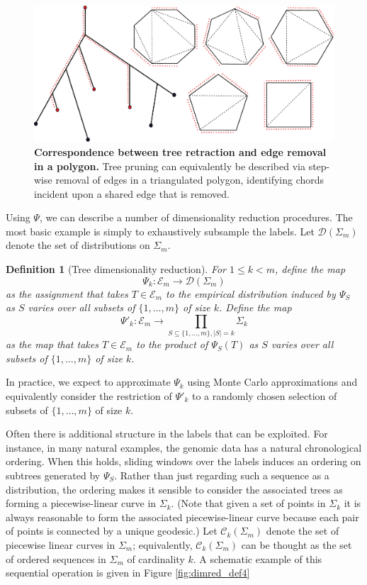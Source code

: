 \documentclass[a4paper,11pt]{article}
\newtheorem{definition}{Definition}
\newcommand{\aC}{\mathcal{C}}
\newcommand{\aD}{\mathcal{D}}
\newcommand{\aE}{\mathcal{E}}
\begin{document}
\begin{figure}
    \centering
    \includegraphics[width=6in]{../figures/dimred_def2.pdf}
    \caption{{\bf Correspondence between tree retraction and edge removal in a polygon.} Tree pruning can equivalently be described via step-wise removal of edges in a triangulated polygon, identifying chords incident upon a shared edge that is removed.}
    \label{fig:dimred_def2}
\end{figure} 

Using $\Psi$, we can describe a number of dimensionality reduction procedures.
The most basic example is simply to exhaustively subsample the labels.
Let $\aD(\Sigma_m)$ denote the set of distributions on $\Sigma_m$.

\begin{definition}[Tree dimensionality reduction]
For $1 \leq k < m$, define the map
\[
\Psi_k \colon \aE_m \to \aD(\Sigma_m)
\]
as the assignment that takes $T \in \aE_m$ to the empirical distribution induced by $\Psi_S$ as $S$ varies over all subsets of $\{1,\ldots,m\}$ of size $k$.
Define the map
\[
\Psi'_k \colon \aE_m \to \prod_{S \subseteq \{1,\ldots,m\}, |S| = k} \Sigma_k 
\]
as the map that takes $T \in \aE_m$ to the product of $\Psi_S(T)$ as $S$ varies over all subsets of $\{1, \ldots, m\}$ of size $k$.
\end{definition}

In practice, we expect to approximate $\Psi_k$ using Monte Carlo approximations and equivalently consider the restriction of $\Psi'_k$ to a randomly chosen selection of subsets of $\{1,\ldots,m\}$ of size $k$.

Often there is additional structure in the labels that can be exploited.
For instance, in many natural examples, the genomic data has a natural chronological ordering.
When this holds, sliding windows over the labels induces an ordering on subtrees generated by $\Psi_S$.
Rather than just regarding such a sequence as a distribution, the ordering makes it sensible to consider the associated trees as forming a piecewise-linear curve in $\Sigma_k$.
(Note that given a set of points in $\Sigma_k$ it is always reasonable to form the associated piecewise-linear curve because each pair of points is connected by a unique geodesic.)
Let $\aC_k(\Sigma_m)$ denote the set of piecewise linear curves in $\Sigma_m$; equivalently, $\aC_k(\Sigma_m)$ can be thought as the set of ordered sequences in $\Sigma_m$ of cardinality $k$.
A schematic example of this sequential operation is given in Figure \ref{fig:dimred_def4}
\end{document}
